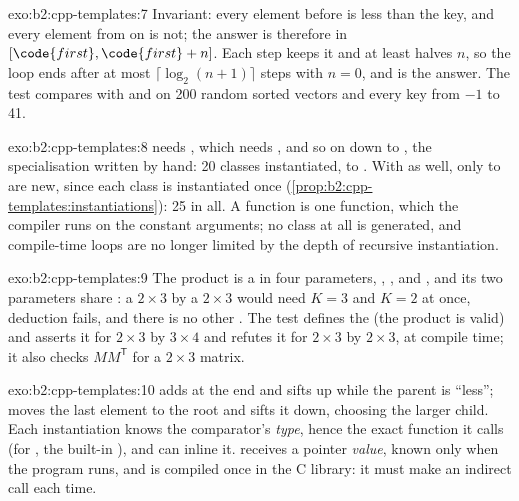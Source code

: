 \begin{solution}{exo:b2:cpp-templates:7}
Invariant: every element before  is less than the key, and every element from  on is not;
the answer is therefore in $[\code{first}, \code{first} + n]$. Each step keeps it and at least halves $n$, so the loop
ends after at most $\lceil \log_2(n + 1) \rceil$ steps with $n = 0$, and  is the answer. The test
compares with  and  on 200 random sorted vectors and every key from
$-1$ to 41.
\end{solution}

\begin{solution}{exo:b2:cpp-templates:8}
 needs , which needs , and so on down to , the
specialisation written by hand: 20 classes instantiated,  to . With  as well,
only  to  are new, since each class is instantiated once
(\cref{prop:b2:cpp-templates:instantiations}): 25 in all. A  function  is one
function, which the compiler runs on the constant arguments; no class at all is generated, and compile-time loops
are no longer limited by the depth of recursive instantiation.
\end{solution}

\begin{solution}{exo:b2:cpp-templates:9}
The product is a  in four parameters, , ,  and , and its two parameters
share : a $2 \times 3$ by a $2 \times 3$ would need $K = 3$ and $K = 2$ at once, deduction fails, and there is
no other . The test defines the   (the product is valid) and asserts
it for $2 \times 3$ by $3 \times 4$ and refutes it for $2 \times 3$ by $2 \times 3$, at compile time; it also checks
$M M^{\mathsf{T}}$ for a $2 \times 3$ matrix.
\end{solution}

\begin{solution}{exo:b2:cpp-templates:10}
 adds at the end and sifts up while the parent is ``less'';  moves the last element to the root
and sifts it down, choosing the larger child. Each instantiation knows the comparator's \emph{type}, hence the exact
function it calls (for , the built-in \code{<}), and can inline it.  receives a
pointer \emph{value}, known only when the program runs, and is compiled once in the C library: it must make an
indirect call each time.
\end{solution}

